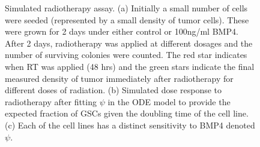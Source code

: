 \documentclass[
  letterpaper,
]{scrreprt}
\theoremstyle{definition}
\theoremstyle{remark}
\begin{document}
\begin{figure}
\begin{minipage}{0.50\linewidth}
{}

\subcaption{\label{fig-sim_dose_response_GBM1a}}

\end{minipage}%
\newline
\begin{minipage}{\linewidth}


\subcaption{\label{fig-psi_values_visualised}}

\end{minipage}%

\caption{\label{fig-days_gained_example_sim}Simulated radiotherapy
assay. (a) Initially a small number of cells were seeded (represented by
a small density of tumor cells). These were grown for 2 days under
either control or 100ng/ml BMP4. After 2 days, radiotherapy was applied
at different dosages and the number of surviving colonies were counted.
The red star indicates when RT was applied (48 hrs) and the green stars
indicate the final measured density of tumor immediately after
radiotherapy for different doses of radiation. (b) Simulated dose
response to radiotherapy after fitting \(\psi\) in the ODE model to
provide the expected fraction of GSCs given the doubling time of the
cell line. (c) Each of the cell lines has a distinct sensitivity to BMP4
denoted \(\psi\).}

\end{figure}%
\end{document}
